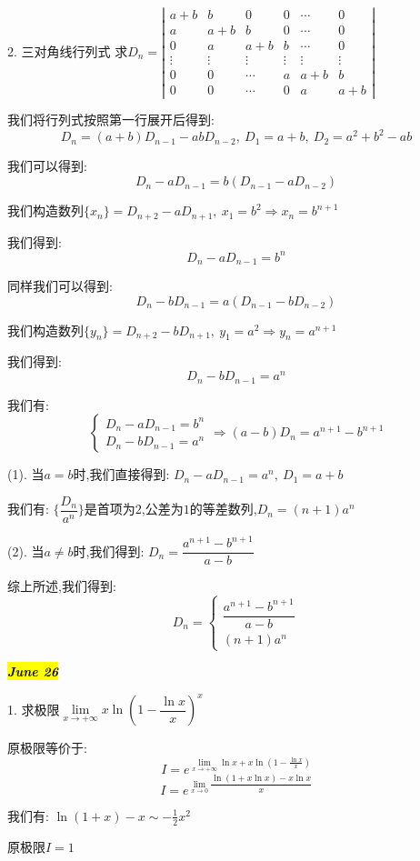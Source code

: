 2. 三对角线行列式
求$D_{n}=\left| 
\begin{matrix}
	a+b&b&0&0&\cdots&0\\
	a&a+b&b&0&\cdots&0\\
	0&a&a+b&b&\cdots&0\\
	\vdots&\vdots&\vdots&\vdots&\vdots&\vdots\\
	0&0&\cdots&a&a+b&b\\
	0&0&\cdots&0&a&a+b
\end{matrix}\right| $
\begin{solution}
	
	我们将行列式按照第一行展开后得到: 
	$$D_{n}=(a+b)D_{n-1}-abD_{n-2},\ D_{1}=a+b,\ D_{2}=a^2+b^2-ab$$
	
	我们可以得到: 
	$$D_{n}-aD_{n-1}=b(D_{n-1}-aD_{n-2})$$
	
	我们构造数列$\{x_{n}\}=D_{n+2}-aD_{n+1},\ x_{1}=b^2\Rightarrow x_{n}=b^{n+1}$
	
	我们得到: 
	$$D_{n}-aD_{n-1}=b^n$$
	
	同样我们可以得到: 
	$$D_{n}-bD_{n-1}=a(D_{n-1}-bD_{n-2})$$
	
	我们构造数列$\{y_{n}\}=D_{n+2}-bD_{n+1},\ y_{1}=a^2\Rightarrow y_{n}=a^{n+1}$
	
	我们得到: 
	$$D_{n}-bD_{n-1}=a^n$$
	
	我们有: $$\left\lbrace
	\begin{array}{l}
		D_{n}-aD_{n-1}=b^n\\
		D_{n}-bD_{n-1}=a^n
	\end{array}
	\right. \Rightarrow (a-b)D_{n}=a^{n+1}-b^{n+1}$$
	
	(1). 当$a=b$时,我们直接得到: $D_{n}-aD_{n-1}=a^n,\ D_{1}=a+b$
	
	我们有: $\{\dfrac{D_{n}}{a^n}\}$是首项为$2$,公差为$1$的等差数列,$D_{n}=(n+1)a^n$
	
	(2). 当$a\neq b$时,我们得到: $D_{n}=\dfrac{a^{n+1}-b^{n+1}}{a-b}$
	
	综上所述,我们得到: 
	$$D_{n}=\left\lbrace
	\begin{array}{l}
		\dfrac{a^{n+1}-b^{n+1}}{a-b}\\
		(n+1)a^n
	\end{array}
	\right. $$
\end{solution}
\hl{\textbf{\textit{June 26}}}

1. 求极限$\lim\limits_{x\rightarrow +\infty}x\ln(1-\dfrac{\ln x}{x})^{x}$
\begin{solution}
	
	原极限等价于: 
	$$I=e^{\lim\limits_{x\rightarrow+\infty}\ln x+x\ln(1-\frac{\ln x}{x})}$$
	$$I=e^{\lim\limits_{x\rightarrow 0 }\dfrac{\ln(1+x\ln x)-x\ln x}{x}}$$
	
	我们有: $\ln(1+x)-x\sim -\frac{1}{2}x^2$
	
	原极限$I=1$
\end{solution}

